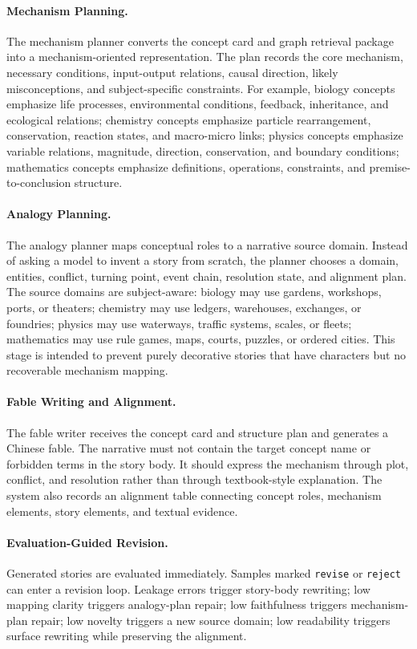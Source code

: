 \documentclass[letterpaper]{article} %
\begin{document}
\paragraph{Mechanism Planning.}
The mechanism planner converts the concept card and graph retrieval package into a mechanism-oriented representation. The plan records the core mechanism, necessary conditions, input-output relations, causal direction, likely misconceptions, and subject-specific constraints. For example, biology concepts emphasize life processes, environmental conditions, feedback, inheritance, and ecological relations; chemistry concepts emphasize particle rearrangement, conservation, reaction states, and macro-micro links; physics concepts emphasize variable relations, magnitude, direction, conservation, and boundary conditions; mathematics concepts emphasize definitions, operations, constraints, and premise-to-conclusion structure.

\paragraph{Analogy Planning.}
The analogy planner maps conceptual roles to a narrative source domain. Instead of asking a model to invent a story from scratch, the planner chooses a domain, entities, conflict, turning point, event chain, resolution state, and alignment plan. The source domains are subject-aware: biology may use gardens, workshops, ports, or theaters; chemistry may use ledgers, warehouses, exchanges, or foundries; physics may use waterways, traffic systems, scales, or fleets; mathematics may use rule games, maps, courts, puzzles, or ordered cities. This stage is intended to prevent purely decorative stories that have characters but no recoverable mechanism mapping.

\paragraph{Fable Writing and Alignment.}
The fable writer receives the concept card and structure plan and generates a Chinese fable. The narrative must not contain the target concept name or forbidden terms in the story body. It should express the mechanism through plot, conflict, and resolution rather than through textbook-style explanation. The system also records an alignment table connecting concept roles, mechanism elements, story elements, and textual evidence.

\paragraph{Evaluation-Guided Revision.}
Generated stories are evaluated immediately. Samples marked \texttt{revise} or \texttt{reject} can enter a revision loop. Leakage errors trigger story-body rewriting; low mapping clarity triggers analogy-plan repair; low faithfulness triggers mechanism-plan repair; low novelty triggers a new source domain; low readability triggers surface rewriting while preserving the alignment.
\end{document}
